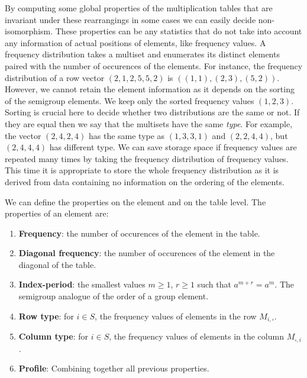 \documentclass{amsart}
\theoremstyle{plain}
\theoremstyle{definition}
\begin{document}
By computing some global properties of the multiplication tables that are invariant under these rearrangings in some cases we can easily decide non-isomorphism.
These properties can be any statistics that do not take into account any information of actual positions of elements, like frequency values.
A frequency distribution takes a multiset and enumerates its distinct elements paired with the number of occurences of the elements.
For instance, the  frequency distribution of a row vector $(2,1,2,5,5,2)$ is $((1,1),(2,3),(5,2))$.
However, we cannot retain the element information as it depends on the sorting of the semigroup elements.
We keep only the sorted frequency values $(1,2,3)$.
Sorting is crucial here to decide whether two distributions are the same or not.
If they are equal then we say that the multisets have the same \emph{type}.
For example, the vector $(2,4,2,4)$ has the same type as $(1,3,3,1)$ and $(2,2,4,4)$, but $(2,4,4,4)$ has different type.
We can save storage space if frequency values are repeated many times by taking the frequency distribution of frequency values.
This time it is appropriate to store the whole frequency distribution as it is derived from data containing no information on the ordering of the elements.

We can define the properties on the element and on the table level. The properties of an element are:

\begin{enumerate}
\item\textbf{Frequency}: the number of occurences of the element in the table.
\item \textbf{Diagonal frequency}: the number of occurences of the element in the diagonal of the table.
\item \textbf{Index-period}: the smallest values $m\geq 1$, $r\geq 1$ such that $a^{m+r}=a^m$. The semigroup analogue of the order of a group element.
\item \textbf{Row type}: for $i\in S$, the frequency values of elements in the row $M_{i,\square}$.
\item \textbf{Column type}:  for $i\in S$, the frequency values of elements in the column $M_{\square,i}$.
\item \textbf{Profile}: Combining together all previous properties.
\end{enumerate} 
\end{document}

